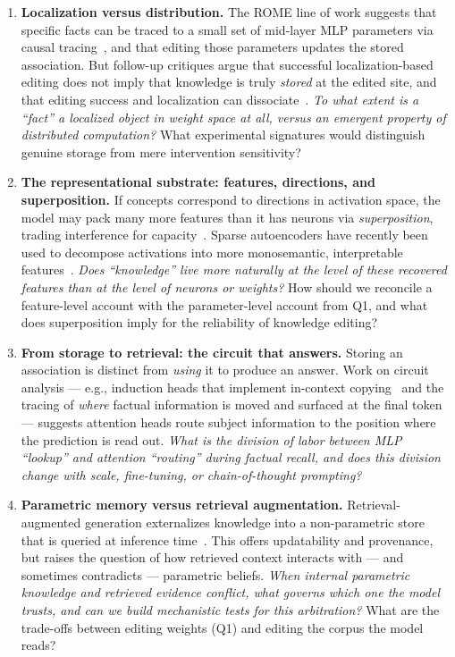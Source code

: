 \documentclass[11pt]{article}
\begin{document}
\begin{enumerate}[leftmargin=*,label=\textbf{Q\arabic*.}]

\item \textbf{Localization versus distribution.} The ROME line of work suggests that specific facts can be traced to a small set of mid-layer MLP parameters via causal tracing~\citep{meng2022rome}, and that editing those parameters updates the stored association. But follow-up critiques argue that successful localization-based editing does not imply that knowledge is truly \emph{stored} at the edited site, and that editing success and localization can dissociate~\citep{hase2023does}. \emph{To what extent is a ``fact'' a localized object in weight space at all, versus an emergent property of distributed computation?} What experimental signatures would distinguish genuine storage from mere intervention sensitivity?

\item \textbf{The representational substrate: features, directions, and superposition.} If concepts correspond to directions in activation space, the model may pack many more features than it has neurons via \emph{superposition}, trading interference for capacity~\citep{elhage2022superposition}. Sparse autoencoders have recently been used to decompose activations into more monosemantic, interpretable features~\citep{bricken2023monosemanticity}. \emph{Does ``knowledge'' live more naturally at the level of these recovered features than at the level of neurons or weights?} How should we reconcile a feature-level account with the parameter-level account from Q1, and what does superposition imply for the reliability of knowledge editing?

\item \textbf{From storage to retrieval: the circuit that answers.} Storing an association is distinct from \emph{using} it to produce an answer. Work on circuit analysis --- e.g., induction heads that implement in-context copying~\citep{olsson2022induction} and the tracing of \emph{where} factual information is moved and surfaced at the final token~\citep{geva2023dissecting} --- suggests attention heads route subject information to the position where the prediction is read out. \emph{What is the division of labor between MLP ``lookup'' and attention ``routing'' during factual recall, and does this division change with scale, fine-tuning, or chain-of-thought prompting?}

\item \textbf{Parametric memory versus retrieval augmentation.} Retrieval-augmented generation externalizes knowledge into a non-parametric store that is queried at inference time~\citep{lewis2020rag,borgeaud2022retro}. This offers updatability and provenance, but raises the question of how retrieved context interacts with --- and sometimes contradicts --- parametric beliefs. \emph{When internal parametric knowledge and retrieved evidence conflict, what governs which one the model trusts, and can we build mechanistic tests for this arbitration?} What are the trade-offs between editing weights (Q1) and editing the corpus the model reads?


\end{enumerate}
\end{document}
